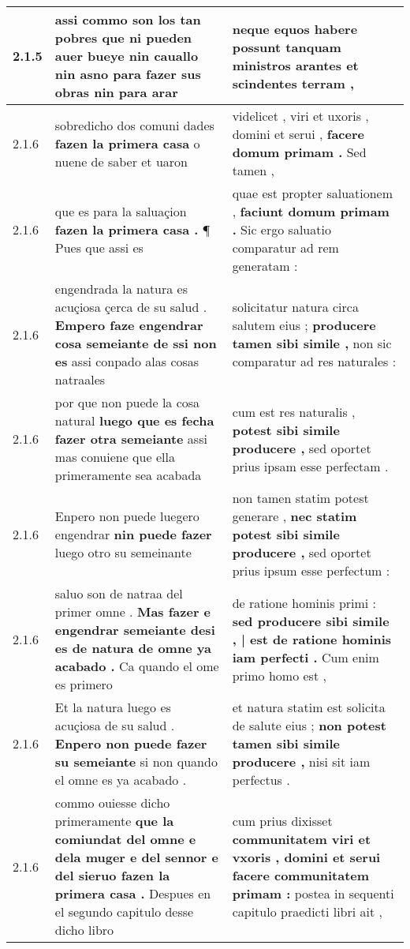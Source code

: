 \begin{tabular}{|p{1cm}|p{6.5cm}|p{6.5cm}|}
2.1.5 & assi commo son los tan pobres que ni pueden auer bueye nin cauallo nin asno \textbf{ para fazer sus obras } nin para arar & neque equos habere possunt \textbf{ tanquam ministros arantes } et scindentes terram , \\\hline
2.1.6 & sobredicho dos comuni dades \textbf{ fazen la primera casa } o nuene de saber et uaron & videlicet , viri et uxoris , domini et serui , \textbf{ facere domum primam . } Sed tamen , \\\hline
2.1.6 & que es para la saluaçion \textbf{ fazen la primera casa . } ¶ Pues que assi es & quae est propter saluationem , \textbf{ faciunt domum primam . } Sic ergo saluatio comparatur ad rem generatam : \\\hline
2.1.6 & engendrada la natura es acuçiosa çerca de su salud . \textbf{ Empero faze engendrar cosa semeiante de ssi non es } assi conpado alas cosas natraales & solicitatur natura circa salutem eius ; \textbf{ producere tamen sibi simile , } non sic comparatur ad res naturales : \\\hline
2.1.6 & por que non puede la cosa natural \textbf{ luego que es fecha fazer otra semeiante } assi mas conuiene que ella primeramente sea acabada & cum est res naturalis , \textbf{ potest sibi simile producere , } sed oportet prius ipsam esse perfectam . \\\hline
2.1.6 & Enpero non puede luegero engendrar \textbf{ nin puede fazer } luego otro su semeinante & non tamen statim potest generare , \textbf{ nec statim potest sibi simile producere , } sed oportet prius ipsum esse perfectum : \\\hline
2.1.6 & saluo son de natraa del primer omne . \textbf{ Mas fazer e engendrar semeiante desi es de natura de omne ya acabado . } Ca quando el ome es primero & de ratione hominis primi : \textbf{ sed producere sibi simile , | est de ratione hominis iam perfecti . } Cum enim primo homo est , \\\hline
2.1.6 & Et la natura luego es acuçiosa de su salud . \textbf{ Enpero non puede fazer su semeiante } si non quando el omne es ya acabado . & et natura statim est solicita de salute eius ; \textbf{ non potest tamen sibi simile producere , } nisi sit iam perfectus . \\\hline
2.1.6 & commo ouiesse dicho primeramente \textbf{ que la comiundat del omne e dela muger e del sennor e del sieruo fazen la primera casa . } Despues en el segundo capitulo desse dicho libro & cum prius dixisset \textbf{ communitatem viri et vxoris , domini et serui facere communitatem primam : } postea in sequenti capitulo praedicti libri ait , \\\hline

\end{tabular}
